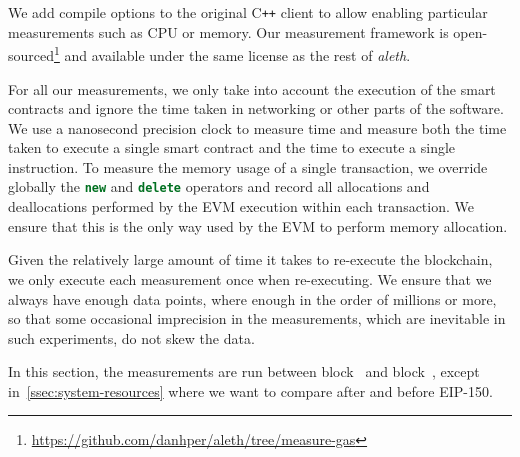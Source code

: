 We add compile options to the original C\texttt{++} client to allow enabling particular measurements such as CPU or memory. Our measurement framework is open-sourced\footnote{\url{https://github.com/danhper/aleth/tree/measure-gas}} and available under the same license as the rest of \textit{aleth}.

For all our measurements, we only take into account the execution of the smart contracts and ignore the time taken in networking or other parts of the software. We use a nanosecond precision clock to measure time and measure both the time taken to execute a single smart contract and the time to execute a single instruction. To measure the memory usage of a single transaction, we override globally the \lstinline[language=C++]{new} and \lstinline[language=C++]{delete} operators and record all allocations and deallocations performed by the EVM execution within each transaction. We ensure that this is the only way used by the EVM to perform memory allocation.

Given the relatively large amount of time it takes to re-execute the blockchain, we only execute each measurement once when re-executing. We ensure that we always have enough data points, where enough in the order of millions or more, so that some occasional imprecision in the measurements, which are inevitable in such experiments, do not skew the data.

In this section, the measurements are run between block~ and block~, except in~\ref{ssec:system-resources} where we want to compare after and before EIP-150.

